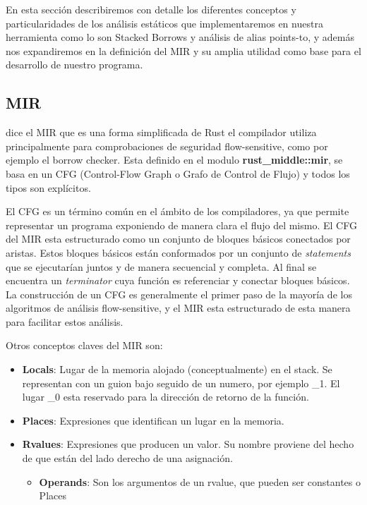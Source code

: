 En esta sección describiremos con detalle los diferentes conceptos y particularidades de los análisis estáticos que implementaremos en nuestra herramienta como lo son Stacked Borrows y análisis de alias points-to, y además nos expandiremos en la definición del MIR y su amplia utilidad como base para el desarrollo de nuestro programa. 

\subsection{MIR}

\cite{rustcdevelopment} dice el MIR que es una forma simplificada de Rust el compilador utiliza principalmente para comprobaciones de seguridad flow-sensitive, como por ejemplo el borrow checker. Esta definido en el modulo \textbf{rust\_middle::mir}, se basa en un CFG (Control-Flow Graph o Grafo de Control de Flujo) y todos los tipos son explícitos.

El CFG es un término común en el ámbito de los compiladores, ya que permite representar un programa exponiendo de manera clara el flujo del mismo. El CFG del MIR esta estructurado como un conjunto de bloques básicos conectados por aristas. Estos bloques básicos están conformados por un conjunto de \textit{statements} que se ejecutarían juntos y de manera secuencial y completa. Al final se encuentra un \textit{terminator} cuya función es referenciar y conectar bloques básicos. La construcción de un CFG es generalmente el primer paso de la mayoría de los algoritmos de análisis flow-sensitive, y el MIR esta estructurado de esta manera para facilitar estos análisis.

Otros conceptos claves del MIR son:
\begin{itemize}
    \item \textbf{Locals}: Lugar de la memoria alojado (conceptualmente) en el stack. Se representan con un guion bajo seguido de un numero, por ejemplo \_1. El lugar \_0 esta reservado para la dirección de retorno de la función.
    \item \textbf{Places}: Expresiones que identifican un lugar en la memoria.
    \item \textbf{Rvalues}: Expresiones que producen un valor. Su nombre proviene del hecho de que están del lado derecho de una asignación.
    \begin{itemize}
        \item \textbf{Operands}: Son los argumentos de un rvalue, que pueden ser constantes o Places
    \end{itemize}
\end{itemize}

